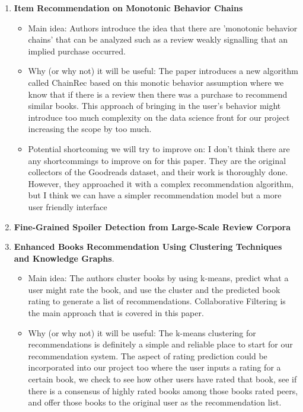 \begin{enumerate}[label=(\arabic*)]

    \item \cite{wan2018item} \textbf{Item Recommendation on Monotonic Behavior Chains}
    \begin{itemize}
        \item Main idea: Authors introduce the idea that there are 'monotonic behavior chains' that can be analyzed such as a review weakly signalling that an implied purchase occurred.
        \item Why (or why not) it will be useful: The paper introduces a new algorithm called ChainRec based on this monotic behavior assumption where we know that if there is a review then there was a purchase to recommend similar books. This approach of bringing in the user's behavior might introduce too much complexity on the data science front for our project increasing the scope by too much.
        \item Potential shortcoming we will try to improve on: I don't think there are any shortcommings to improve on for this paper. They are the original collectors of the Goodreads dataset, and their work is thoroughly done. However, they approached it with a complex recommendation algorithm, but I think we can have a simpler recommendation model but a more user friendly interface
    \end{itemize}
    \item \cite{wan2019fine} \textbf{Fine-Grained Spoiler Detection from Large-Scale Review Corpora}
    \item \cite{valdiviezo2022enhanced} \textbf{Enhanced Books Recommendation Using Clustering Techniques and Knowledge Graphs}.
    \begin{itemize}
        \item Main idea: The authors cluster books by using k-means, predict what a user might rate the book, and use the cluster and the predicted book rating to generate a list of recommendations.   Collaborative Filtering is the main approach that is covered in this paper.
        \item Why (or why not) it will be useful: The k-means clustering for recommendations is definitely a simple and reliable place to start for our recommendation system.  The aspect of rating prediction could be incorporated into our project too where the user inputs a rating for a certain book, we check to see how other users have rated that book, see if there is a consensus of highly rated books among those books rated peers, and offer those books to the original user as the recommendation list.

\end{itemize}
\end{enumerate}
